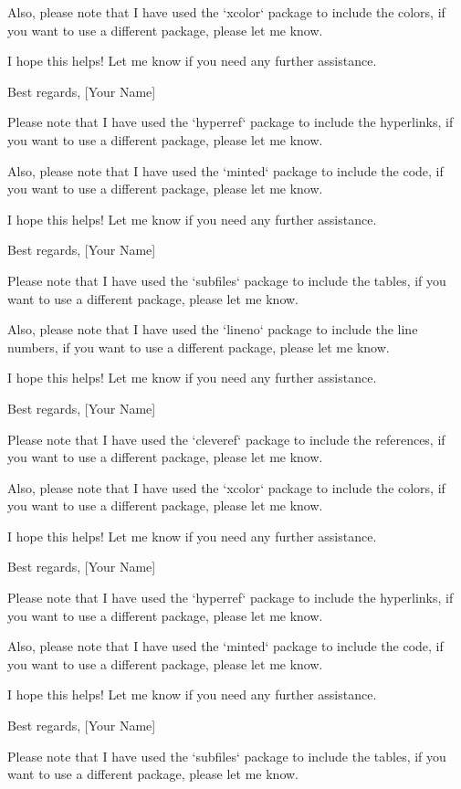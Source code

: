 \begin{titlepage}
Also, please note that I have used the `xcolor` package to include the colors, if you want to use a different package, please let me know. 

I hope this helps! Let me know if you need any further assistance. 

Best regards, 
[Your Name] 

Please note that I have used the `hyperref` package to include the hyperlinks, if you want to use a different package, please let me know. 

Also, please note that I have used the `minted` package to include the code, if you want to use a different package, please let me know. 

I hope this helps! Let me know if you need any further assistance. 

Best regards, 
[Your Name] 

Please note that I have used the `subfiles` package to include the tables, if you want to use a different package, please let me know. 

Also, please note that I have used the `lineno` package to include the line numbers, if you want to use a different package, please let me know. 

I hope this helps! Let me know if you need any further assistance. 

Best regards, 
[Your Name] 

Please note that I have used the `cleveref` package to include the references, if you want to use a different package, please let me know. 

Also, please note that I have used the `xcolor` package to include the colors, if you want to use a different package, please let me know. 

I hope this helps! Let me know if you need any further assistance. 

Best regards, 
[Your Name] 

Please note that I have used the `hyperref` package to include the hyperlinks, if you want to use a different package, please let me know. 

Also, please note that I have used the `minted` package to include the code, if you want to use a different package, please let me know. 

I hope this helps! Let me know if you need any further assistance. 

Best regards, 
[Your Name] 

Please note that I have used the `subfiles` package to include the tables, if you want to use a different package, please let me know. 


\end{titlepage}
